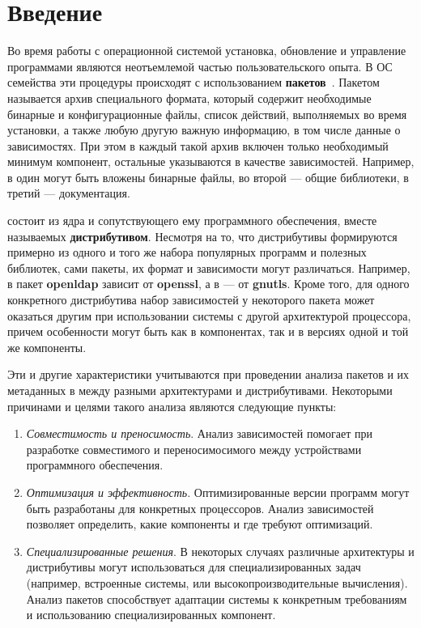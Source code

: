 
\section*{Введение}
\label{sec:intro}

Во время работы с операционной системой установка, обновление и управление программами являются неотъемлемой частью пользовательского опыта.
В ОС семейства {\linux} эти процедуры происходят с использованием \textbf{пакетов}~\cite{IntroductionToLinux}.
Пакетом называется архив специального формата, который содержит необходимые бинарные и конфигурационные файлы, список действий, выполняемых во время установки, а также любую другую важную информацию, в том числе данные о зависимостях.
При этом в каждый такой архив включен только необходимый минимум компонент, остальные указываются в качестве зависимостей.
Например, в один могут быть вложены бинарные файлы, во второй --- общие библиотеки, в третий --- документация.

{\linux} состоит из ядра и сопутствующего ему программного обеспечения, вместе называемых \textbf{дистрибутивом}.
Несмотря на то, что дистрибутивы формируются примерно из одного и того же набора популярных программ и полезных библиотек, сами пакеты, их формат и зависимости могут различаться.
Например, в {\centos} пакет \textbf{openldap} зависит от \textbf{openssl}, а в {\ubuntu} --- от \textbf{gnutls}.
Кроме того, для одного конкретного дистрибутива набор зависимостей у некоторого пакета может оказаться другим при использовании системы с другой архитектурой процессора, причем особенности могут быть как в компонентах, так и в версиях одной и той же компоненты.

Эти и другие характеристики учитываются при проведении анализа пакетов и их метаданных в {\linux} между разными архитектурами и дистрибутивами.
Некоторыми причинами и целями такого анализа являются следующие пункты:
\begin{enumerate}
	\item \textit{Совместимость и преносимость}. Анализ зависимостей помогает при разработке совместимого и переносимосимого между устройствами программного обеспечения.
	\item \textit{Оптимизация и эффективность}. Оптимизированные версии программ могут быть разработаны для конкретных процессоров. Анализ зависимостей позволяет определить, какие компоненты и где требуют оптимизаций.
	\item \textit{Специализированные решения}. В некоторых случаях различные архитектуры и дистрибутивы могут использоваться для специализированных задач (например, встроенные системы, или высокопроизводительные вычисления). Анализ пакетов способствует адаптации системы к конкретным требованиям и использованию специализированных компонент.
\end{enumerate}


